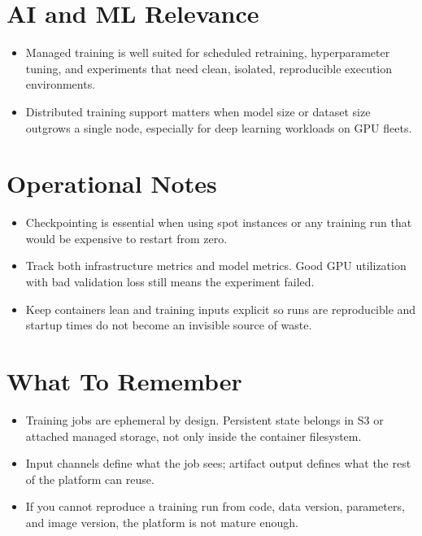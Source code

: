\documentclass[10pt,twocolumn]{article}
\begin{document}
\section*{AI and ML Relevance}
\begin{itemize}
\item Managed training is well suited for scheduled retraining, hyperparameter tuning, and experiments that need clean, isolated, reproducible execution environments.
\item Distributed training support matters when model size or dataset size outgrows a single node, especially for deep learning workloads on GPU fleets.
\end{itemize}

\section*{Operational Notes}
\begin{itemize}
\item Checkpointing is essential when using spot instances or any training run that would be expensive to restart from zero.
\item Track both infrastructure metrics and model metrics. Good GPU utilization with bad validation loss still means the experiment failed.
\item Keep containers lean and training inputs explicit so runs are reproducible and startup times do not become an invisible source of waste.
\end{itemize}

\section*{What To Remember}
\begin{itemize}
\item Training jobs are ephemeral by design. Persistent state belongs in S3 or attached managed storage, not only inside the container filesystem.
\item Input channels define what the job sees; artifact output defines what the rest of the platform can reuse.
\item If you cannot reproduce a training run from code, data version, parameters, and image version, the platform is not mature enough.
\end{itemize}
\end{document}
